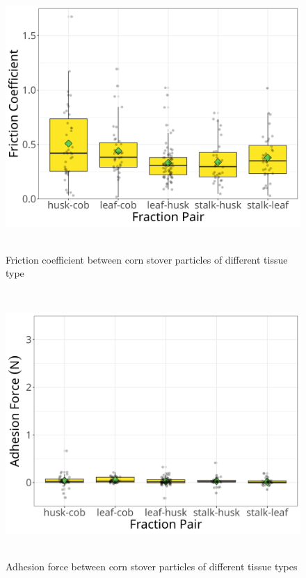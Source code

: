 \documentclass[xcolor=dvipsnames,10pt,hidelinks]{article}
\begin{document}
\begin{figure}[htbp]
\centering
\includegraphics[height=4in]{./figures/cs_cs_different_fraction_coeff_mu_box_plt.png}
\caption{\label{fig:org42a1abb}Friction coefficient between corn stover particles of different tissue type}
\end{figure}

\newpage

\begin{figure}[htbp]
\centering
\includegraphics[height=4in]{./figures/cs_cs_different_fraction_coeff_c_box_plt.png}
\caption{\label{fig:orgac06dc5}Adhesion force between corn stover particles of different tissue types}
\end{figure}
\end{document}
